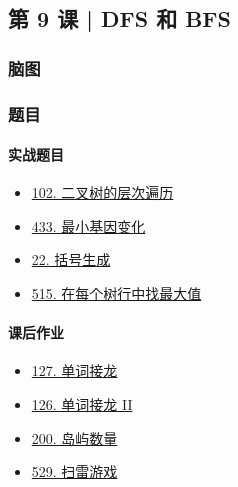 \subsection{第 9 课 | DFS 和 BFS}

\subsubsection{脑图}

\subsubsection{题目}

\paragraph{实战题目}

\begin{itemize}
  \item \hyperref[leetcode:102]{102. 二叉树的层次遍历}
  \item \hyperref[leetcode:433]{433. 最小基因变化}
  \item \hyperref[leetcode:22]{22. 括号生成}
  \item \hyperref[leetcode:515]{515. 在每个树行中找最大值}
\end{itemize}

\paragraph{课后作业}

\begin{itemize}
  \item \hyperref[leetcode:127]{127. 单词接龙}
  \item \hyperref[leetcode:126]{126. 单词接龙 II}
  \item \hyperref[leetcode:200]{200. 岛屿数量}
  \item \hyperref[leetcode:529]{529. 扫雷游戏}
\end{itemize}
